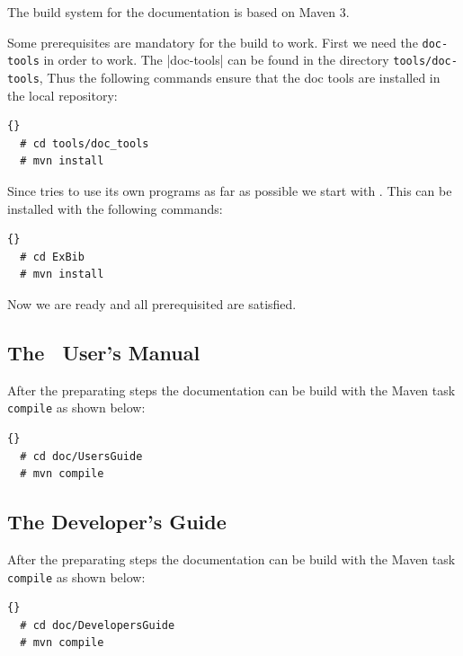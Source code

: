 The build system for the documentation is based on Maven 3.

Some prerequisites are mandatory for the build to work. First we need
the \verb|doc-tools| in order to work. The
|doc-tools| can be found in the directory \verb|tools/doc-tools|, Thus
the following commands ensure that the doc tools are installed in the
local repository:

\begin{lstlisting}{}
  # cd tools/doc_tools
  # mvn install
\end{lstlisting}

Since \ExBib\index{\ExBib@ExBib} tries to use its own programs as far
as possible we start with \ExBib. This can be installed with the
following commands:

\begin{lstlisting}{}
  # cd ExBib
  # mvn install
\end{lstlisting}

Now we are ready and all prerequisited are satisfied.


\subsection{The \ExTeX\ User's Manual}

After the preparating steps the documentation can be build with the
Maven task \texttt{compile} as shown below:

\begin{lstlisting}{}
  # cd doc/UsersGuide
  # mvn compile
\end{lstlisting}

\subsection{The Developer's Guide}

After the preparating steps the documentation can be build with the
Maven task \texttt{compile} as shown below:

\begin{lstlisting}{}
  # cd doc/DevelopersGuide
  # mvn compile
\end{lstlisting}
